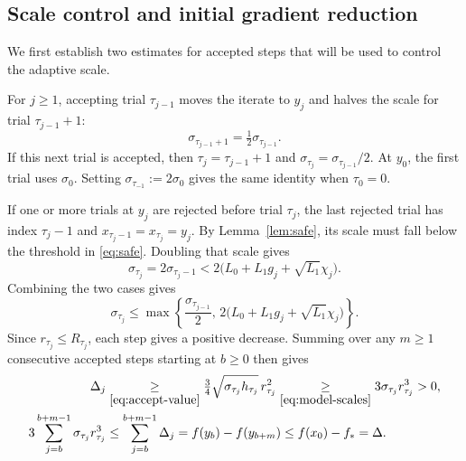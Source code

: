 \subsection{Scale control and initial gradient reduction}
\label{sec:potential-proof}

We first establish two estimates for accepted steps that will be used to control the adaptive scale.

For $j\ge1$, accepting trial $\tau_{j-1}$ moves the iterate to $y_j$
and halves the scale for trial $\tau_{j-1}+1$:
\[
 \sigma_{\tau_{j-1}+1}=\tfrac12\sigma_{\tau_{j-1}}.
\]
If this next trial is accepted, then $\tau_j=\tau_{j-1}+1$ and
$\sigma_{\tau_j}=\sigma_{\tau_{j-1}}/2$.
At $y_0$, the first trial uses $\sigma_0$. Setting
$\sigma_{\tau_{-1}}:=2\sigma_0$ gives the same identity when $\tau_0=0$.

If one or more trials at $y_j$ are rejected before trial $\tau_j$,
the last rejected trial has index $\tau_j-1$ and
$x_{\tau_j-1}=x_{\tau_j}=y_j$. By Lemma~\ref{lem:safe}, its scale
must fall below the threshold in \eqref{eq:safe}. Doubling that scale gives
\[
 \sigma_{\tau_j}=2\sigma_{\tau_j-1}
 <2\bigl(L_0+L_1g_j+\sqrt{L_1}\chi_j\bigr).
\]
Combining the two cases gives
\begin{equation}\label{eq:backtrack-upper}
 \sigma_{\tau_j}\le\max\left\{
       \frac{\sigma_{\tau_{j-1}}}{2},\,
       2\bigl(L_0+L_1g_j+\sqrt{L_1}\chi_j\bigr)\right\}.
\end{equation}
Since $r_{\tau_j}\le R_{\tau_j}$, each step gives a positive decrease.
Summing over any $m\ge1$ consecutive accepted steps starting at $b\ge0$ then gives
\begin{equation}\label{eq:descent-sum}
 \begin{aligned}
 \Delta_j&\underset{\eqref{eq:accept-value}}{\ge}
       \tfrac34\sqrt{\sigma_{\tau_j}h_{\tau_j}}\,r_{\tau_j}^2
       \underset{\eqref{eq:model-scales}}{\ge}3\sigma_{\tau_j}r_{\tau_j}^3>0,\\
 3\sum_{j=b}^{b+m-1}\sigma_{\tau_j}r_{\tau_j}^3
 &\le\sum_{j=b}^{b+m-1}\Delta_j
 =f(y_b)-f(y_{b+m})\le f(x_0)-f_*=\Delta.
 \end{aligned}
\end{equation}

